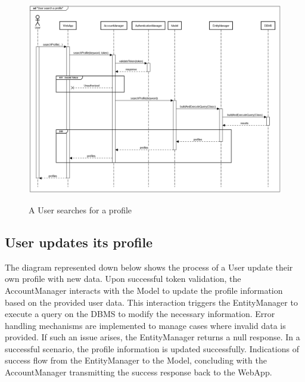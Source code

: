 \documentclass{Configuration_Files/Template}
\begin{document}
\begin{figure}[H]
\centering
\includegraphics[scale = 0.33]{Images/diagrams/sequences/searchProfile.png}\\
\caption{A User searches for a profile}
\end{figure}

\subsection{User updates its profile}

The diagram represented down below shows the process of a User update their own profile with new data. Upon successful token validation, the AccountManager interacts with the Model to update the profile information based on the provided user data. This interaction triggers the EntityManager to execute a query on the DBMS to modify the necessary information. Error handling mechanisms are implemented to manage cases where invalid data is provided. If such an issue arises, the EntityManager returns a null response. In a successful scenario, the profile information is updated successfully. Indications of success flow from the EntityManager to the Model, concluding with the AccountManager transmitting the success response back to the WebApp.
\end{document}
